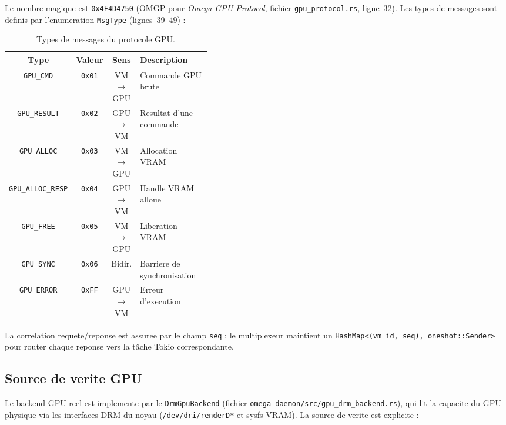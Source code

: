 Le nombre magique est \texttt{0x4F4D4750} (\og OMGP \fg{} pour \textit{Omega GPU Protocol}, fichier \texttt{gpu\_protocol.rs}, ligne~32). Les types de messages sont definis par l'enumeration \texttt{MsgType} (lignes~39--49) :

\begin{table}[htbp]
    \centering
    \caption{Types de messages du protocole GPU.}
    \label{tab:gpu-msg-types}
    \begin{tabular}{c c c p{0.40\linewidth}}
        \toprule
        \textbf{Type} & \textbf{Valeur} & \textbf{Sens} & \textbf{Description} \\
        \midrule
        \texttt{GPU\_CMD} & \texttt{0x01} & VM$\to$GPU & Commande GPU brute \\
        \texttt{GPU\_RESULT} & \texttt{0x02} & GPU$\to$VM & Resultat d'une commande \\
        \texttt{GPU\_ALLOC} & \texttt{0x03} & VM$\to$GPU & Allocation VRAM \\
        \texttt{GPU\_ALLOC\_RESP} & \texttt{0x04} & GPU$\to$VM & Handle VRAM alloue \\
        \texttt{GPU\_FREE} & \texttt{0x05} & VM$\to$GPU & Liberation VRAM \\
        \texttt{GPU\_SYNC} & \texttt{0x06} & Bidir. & Barriere de synchronisation \\
        \texttt{GPU\_ERROR} & \texttt{0xFF} & GPU$\to$VM & Erreur d'execution \\
        \bottomrule
    \end{tabular}
\end{table}

La correlation requete/reponse est assuree par le champ \texttt{seq} : le multiplexeur maintient un \texttt{HashMap<(vm\_id, seq), oneshot::Sender>} pour router chaque reponse vers la t\^ache Tokio correspondante.

\subsection{Source de verite GPU}
\label{subsec:gpu-source-verite}

Le backend GPU reel est implemente par le \texttt{DrmGpuBackend} (fichier \texttt{omega-daemon/src/gpu\_drm\_backend.rs}), qui lit la capacite du GPU physique via les interfaces DRM du noyau (\texttt{/dev/dri/renderD*} et sysfs VRAM). La source de verite est explicite :

